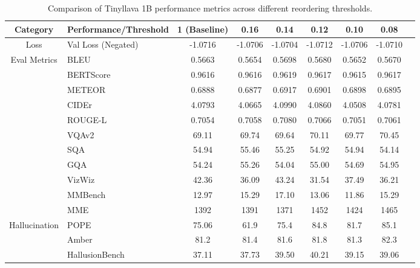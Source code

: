 \documentclass[11pt]{article}
\begin{document}
\begin{table}[H]
\caption{Comparison of Tinyllava 1B performance metrics across different reordering thresholds.}
\centering
\scriptsize
\begin{tabular}{@{}c l ccccccc@{}}
\toprule
\textbf{Category} & \textbf{Performance/Threshold} & \textbf{1 (Baseline)} & \textbf{0.16} & \textbf{0.14} & \textbf{0.12} & \textbf{0.10} & \textbf{0.08} \\
\midrule
\multirow{1}{*}{\centering Loss} 
 & Val Loss (Negated) & -1.0716 & -1.0706 & \textcolor{customgreen}{-1.0704} & -1.0712 & -1.0706 & -1.0710 \\

\midrule
\multirow{5}{*}{\centering Eval Metrics} 
 & BLEU & 0.5663 & 0.5654 & \textcolor{customgreen}{0.5698} & 0.5680 & 0.5652 & 0.5670 \\
 & BERTScore & 0.9616 & 0.9616 & \textcolor{customgreen}{0.9619} & 0.9617 & 0.9615 & 0.9617 \\
 & METEOR & 0.6888 & 0.6877 & \textcolor{customgreen}{0.6917} & 0.6901 & 0.6898 & 0.6895 \\
 & CIDEr & 4.0793 & 4.0665 & \textcolor{customgreen}{4.0990} & 4.0860 & 4.0508 & 4.0781 \\
 & ROUGE-L & 0.7054 & 0.7058 & \textcolor{customgreen}{0.7080} & 0.7066 & 0.7051 & 0.7061 \\

\midrule
\multirow{3}{*}{\centering{VQA}} 
 & VQAv2 & 69.11 & 69.74 & 69.64 & 70.11 & 69.77 & \textcolor{customgreen}{70.45} \\
 & SQA & 54.94 & \textcolor{customgreen}{55.46} & 55.25 & 54.92 & 54.94 & 54.14 \\
 & GQA & 54.24 & \textcolor{customgreen}{55.26} & 54.04 & 55.00 & 54.69 & 54.95 \\


 & VizWiz & 42.36 & 36.09 & \textcolor{customgreen}{43.24} & 31.54 & 37.49 & 36.21 \\

\midrule
\multirow{2}{*}{\centering{Multimodal}} 
 & MMBench & 12.97 & 15.29 & \textcolor{customgreen}{17.10} & 13.06 & 11.86 & 15.29 \\
 & MME & 1392 & 1391 & 1371 & 1452 & 1424 & \textcolor{customgreen}{1465} \\

\midrule
\multirow{3}{*}{\centering Hallucination} 
 & POPE & 75.06 & 61.9 & 75.4 & 84.8 & 81.7 & \textcolor{customgreen}{85.1} \\
 & Amber & 81.2 & 81.4 & 81.6 & 81.8 & 81.3 & \textcolor{customgreen}{82.3} \\
 & HallusionBench & 37.11 & 37.73 & 39.50 & \textcolor{customgreen}{40.21} & 39.15 & 39.06 \\


\bottomrule
\end{tabular}
\label{tab:threshold}
\end{table}
\end{document}
